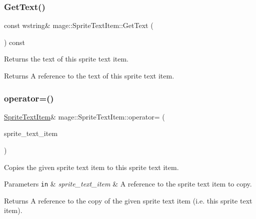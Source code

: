 \subsubsection{\texorpdfstring{Get\+Text()}{GetText()}}
{\footnotesize\ttfamily const wstring\& mage\+::\+Sprite\+Text\+Item\+::\+Get\+Text (\begin{DoxyParamCaption}{ }\end{DoxyParamCaption}) const}

Returns the text of this sprite text item.

\begin{DoxyReturn}{Returns}
A reference to the text of this sprite text item. 
\end{DoxyReturn}
\hypertarget{structmage_1_1_sprite_text_item_ac0c8772b01eaa324e46dc53d08a9ea35}{}\label{structmage_1_1_sprite_text_item_ac0c8772b01eaa324e46dc53d08a9ea35} 
\subsubsection{\texorpdfstring{operator=()}{operator=()}\hspace{0.1cm}{\footnotesize\ttfamily [1/2]}}
{\footnotesize\ttfamily \hyperlink{structmage_1_1_sprite_text_item}{Sprite\+Text\+Item}\& mage\+::\+Sprite\+Text\+Item\+::operator= (\begin{DoxyParamCaption}\item[{const \hyperlink{structmage_1_1_sprite_text_item}{Sprite\+Text\+Item} \&}]{sprite\+\_\+text\+\_\+item }\end{DoxyParamCaption})\hspace{0.3cm}{\ttfamily [default]}}

Copies the given sprite text item to this sprite text item.


\begin{DoxyParams}[1]{Parameters}
\mbox{\tt in}  & {\em sprite\+\_\+text\+\_\+item} & A reference to the sprite text item to copy. \\
\hline
\end{DoxyParams}
\begin{DoxyReturn}{Returns}
A reference to the copy of the given sprite text item (i.\+e. this sprite text item). 
\end{DoxyReturn}
\hypertarget{structmage_1_1_sprite_text_item_aadbeeb0fb30b15675370f0b6eb65a9a2}{}\label{structmage_1_1_sprite_text_item_aadbeeb0fb30b15675370f0b6eb65a9a2} 
